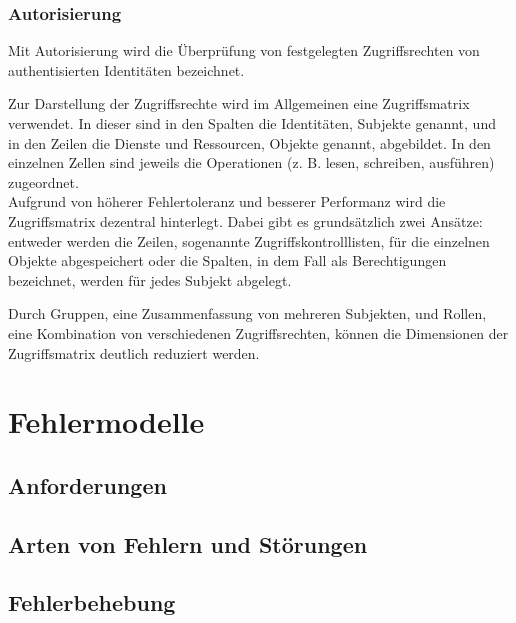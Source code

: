 \documentclass[12pt,a4paper,parskip=half]{scrreprt}
\begin{document}
\subsection{Autorisierung}

Mit Autorisierung wird die Überprüfung von festgelegten Zugriffsrechten von authentisierten Identitäten bezeichnet. 

Zur Darstellung der Zugriffsrechte wird im Allgemeinen eine Zugriffsmatrix verwendet. In dieser sind in den Spalten die Identitäten, Subjekte genannt, und in den Zeilen die Dienste und Ressourcen, Objekte genannt, abgebildet. In den einzelnen Zellen sind jeweils die Operationen (z. B. lesen, schreiben, ausführen) zugeordnet. \\
Aufgrund von höherer Fehlertoleranz und besserer Performanz wird die Zugriffsmatrix dezentral hinterlegt. Dabei gibt es grundsätzlich zwei Ansätze: entweder werden die Zeilen, sogenannte Zugriffskontrolllisten, für die einzelnen Objekte abgespeichert oder die Spalten, in dem Fall als Berechtigungen bezeichnet, werden für jedes Subjekt abgelegt.

Durch Gruppen, eine Zusammenfassung von mehreren Subjekten, und Rollen, eine Kombination von verschiedenen Zugriffsrechten, können die Dimensionen der Zugriffsmatrix deutlich reduziert werden.

\chapter{Fehlermodelle}


\section{Anforderungen}


\section{Arten von Fehlern und Störungen}


\section{Fehlerbehebung}


\newpage

\nocite{*}
\thispagestyle{headings}


 
\end{document}
